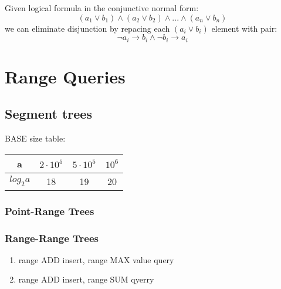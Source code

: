 \documentclass[13pt]{article}
\begin{document}
Given logical formula in the conjunctive normal form:
\[ (a_1 \vee b_1) \wedge  (a_2 \vee b_2) \wedge ... \wedge (a_{n} \vee b_{n})\]
we can eliminate disjunction by repacing each \( (a_i \vee b_i) \) element with pair:
\[ \neg a_i \rightarrow b_i \wedge \neg b_i \rightarrow a_i \]



\section{Range Queries}

\subsection{Segment trees}

BASE size table:
\begin{center}
	\begin{tabular}{ c || c | c | c }
		a          & \(2 \cdot 10^5\) & \(5 \cdot 10^5\) & \(10^6\) \\
		\hline\hline
		\(log_2a\) & 18               & 19               & 20
	\end{tabular}
\end{center}

\subsubsection{Point-Range Trees}



\subsubsection{Range-Range Trees}
\begin{enumerate}
	\item range ADD insert, range MAX value query
	      
	      
	\item range ADD insert, range SUM qyerry
	      
	      
\end{enumerate}
\end{document}
